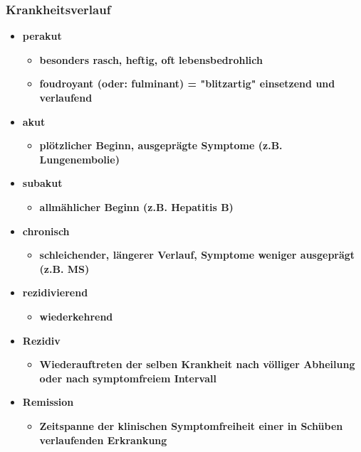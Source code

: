 \subsubsection{Krankheitsverlauf}
	\begin{itemize}
		\item \textbf{perakut}
			\begin{itemize}
				\item \textbf{besonders rasch, heftig, oft lebensbedrohlich}
				\item \textbf{foudroyant (oder: fulminant) = "blitzartig" einsetzend und verlaufend}
			\end{itemize}
		\item \textbf{akut}
			\begin{itemize}
				\item \textbf{plötzlicher Beginn, ausgeprägte Symptome (z.B. Lungenembolie)}
			\end{itemize}
		\item \textbf{subakut}
			\begin{itemize}
				\item \textbf{allmählicher Beginn (z.B. Hepatitis B)}
			\end{itemize}
		\item \textbf{chronisch}
			\begin{itemize}
				\item \textbf{schleichender, längerer Verlauf, Symptome weniger ausgeprägt (z.B. MS)}
			\end{itemize}
		\item \textbf{rezidivierend}
			\begin{itemize}
				\item \textbf{wiederkehrend}
			\end{itemize}
		\item \textbf{Rezidiv}
			\begin{itemize}
				\item \textbf{Wiederauftreten der selben Krankheit nach völliger Abheilung oder nach symptomfreiem Intervall}
			\end{itemize}
		\item \textbf{Remission}
			\begin{itemize}
				\item \textbf{Zeitspanne der klinischen Symptomfreiheit einer in Schüben verlaufenden Erkrankung}
			\end{itemize}
	\end{itemize}

